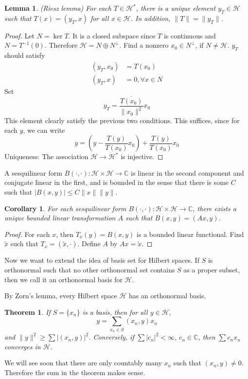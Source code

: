 \documentclass[12pt]{article}
\theoremstyle{plain}
\newtheorem{theorem}[equation]{Theorem}
\newtheorem{corollary}[equation]{Corollary}
\newtheorem{lemma}[equation]{Lemma}
\theoremstyle{definition}
\theoremstyle{named}
\newcommand{\shH}{\mathscr{H}}
\newcommand{\<}{\langle}
\renewcommand{\>}{\rangle}
\def\wt{\widetilde}
\newcommand{\IC}{\mathbb{C}}
\begin{document}
\begin{lemma}
\emph{(Riesz lemma)}
\label{Riesz}
For each $T \in \shH^*$, there is a unique element $y_T \in \shH$ such that $T(x) = (y_T, x)$ for all $x \in \shH$. In addition, $\| T \| = \| y_T \|$. 
\end{lemma} 
\begin{proof}
Let $N = \ker T$. It is a closed subspace since $T$ is continuous and $N = T^{-1}(0)$. Therefore $\shH = N \oplus N^\perp$. Find a nonzero $x_0 \in N^\perp$, if $N \neq \shH$. 
$y_T$ should satisfy
\begin{align*}
(y_T, x_0) &= T(x_0) \\
(y_T, x) &= 0, \forall x \in N
\end{align*}
Set 
$$ y_T = \frac{\overline{T(x_0)}}{\| x_0 \|^2} x_0 $$
This element clearly satisfy the previous two conditions. This suffices, since for each $y$, we can write
$$ y = (y - \frac{T(y)}{T(x_0)} x_0) +  \frac{T(y)}{T(x_0)} x_0 $$
Uniqueness: The association $\shH \to \shH^*$ is injective. 
\end{proof}
A sesquilinear form $B(\cdot, \cdot) : \shH \times \shH \to \IC$ is linear in the second component and conjugate linear in the first, and is bounded in the sense that there is some $C$ such that $|B(x, y)| \le C \| x\| \| y \|$. 
\begin{corollary}
For each sesquilinear form $B(\cdot, \cdot) : \shH \times \shH \to \IC$, there exists a unique bounded linear transformation $A$ such that $B(x, y) = (Ax, y)$. 
\end{corollary}
\begin{proof}
For each $x$, then $T_x(y) = B(x, y)$ is a bounded linear functional. Find $\wt{x}$ such that $T_x = (\wt{x}, \cdot) $. Define $A$ by $Ax = \wt{x}$. 
\end{proof}

Now we want to extend the idea of basis set for Hilbert spaces. If $S$ is orthonormal such that no other orthonormal set contains $S$ as a proper subset, then we call it an orthonormal basis for $\shH$. 

By Zorn's lemma, every Hilbert space $\shH$ has an orthonormal basis. 
\begin{theorem}
If $S = \{ x_n \}$ is a basis, then for all $y \in \shH$, 
$$ y = \sum_{x_n \in S} (x_n, y) x_n $$
and $\| y \|^2 \ge \sum | (x_n, y)|^2$. Conversely, if $\sum | c_n |^2 < \infty$, $c_n \in \IC$, then $\sum c_n x_n$ converges in $\shH$. 
\end{theorem} 
We will see soon that there are only countably many $x_n$ such that $(x_n, y) \neq 0$. Therefore the sum in the theorem makes sense. 
\end{document}
